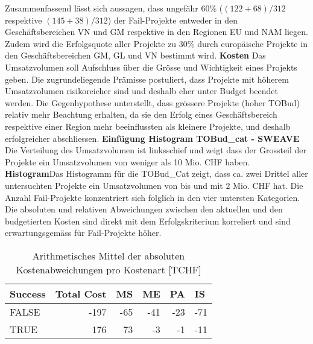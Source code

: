 Zusammenfassend lässt sich aussagen, dass ungefähr 60\% ($(122+68)/312$ respektive $(145+38)/312$) der Fail-Projekte entweder in den Geschäftsbereichen VN und GM respektive in den Regionen EU und NAM liegen. Zudem wird die Erfolgsquote aller Projekte zu 30\% durch europäische Projekte in den Geschäftsbereichen GM, GL und VN bestimmt wird.
%
%
\newline\newline\textbf{Kosten} Das Umsatzvolumen soll Aufschluss über die Grösse und Wichtigkeit eines Projekts geben. Die zugrundeliegende Prämisse postuliert, dass Projekte mit höherem Umsatzvolumen risikoreicher sind und deshalb eher unter Budget beendet werden. Die Gegenhypothese unterstellt, dass grössere Projekte (hoher TOBud) relativ mehr Beachtung erhalten, da sie den Erfolg eines Geschäftsbereich respektive einer Region mehr beeinflussten als kleinere Projekte, und deshalb erfolgreicher abschliessen.
\newline\textbf{Einfügung Histogram TOBud\_cat - SWEAVE}
\newline
Die Verteilung des Umsatzvolumen ist linksschief und zeigt dass der Grossteil der Projekte ein Umsatzvolumen von weniger als 10 Mio. CHF haben.
\newline\textbf{Histogram}Das Histogramm für die TOBud\_Cat zeigt, dass ca. zwei Drittel aller untersuchten Projekte ein Umsatzvolumen von bis und mit 2 Mio. CHF hat. Die Anzahl Fail-Projekte konzentriert sich folglich in den vier untersten Kategorien.
\newline\newline Die absoluten und relativen Abweichungen zwischen den aktuellen und den budgetierten Kosten sind direkt mit dem Erfolgskriterium korreliert und sind erwartungsgemäss für Fail-Projekte höher. 
\begin{table}[H]
	\centering
	\caption{Arithmetisches Mittel der absoluten Kostenabweichungen pro Kostenart [TCHF]}
	\begin{tabular}{lrrrrr}
		\textbf{Success} & \multicolumn{1}{l}{\textbf{Total Cost}} & \multicolumn{1}{l}{\textbf{MS}} & \multicolumn{1}{l}{\textbf{ME}} & \multicolumn{1}{l}{\textbf{PA}} & \multicolumn{1}{l}{\textbf{IS}}
		\\\hline
		FALSE & -197  & -65   & -41   & -23   & -71 \\
		TRUE  & 176   & 73    & -3    & -1    & -11 \\
	\end{tabular}%
	\label{mcostabs}%
\end{table}%
